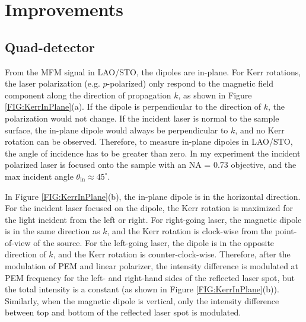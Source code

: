 \documentclass[pdflatex, sectionletters, 12pt]{pittetd}    %
\begin{document}
\section{Improvements}

\subsection{Quad-detector}

From the MFM signal in LAO/STO, the dipoles are in-plane. For Kerr rotations, the laser polarization (e.g. $p$-polarized) only respond to the magnetic field component along the direction of propagation $k$, as shown in Figure \ref{FIG:KerrInPlane}(a). If the dipole is perpendicular to the direction of $k$, the polarization would not change. If the incident laser is normal to the sample surface, the in-plane dipole would always be perpendicular to $k$, and no Kerr rotation can be observed. Therefore, to measure in-plane dipoles in LAO/STO, the angle of incidence has to be greater than zero. In my experiment the incident polarized laser is focused onto the sample with an NA = 0.73 objective, and the max incident angle $\theta_\mathrm{in} \approx 45^{\circ}$.  

In Figure \ref{FIG:KerrInPlane}(b), the in-plane dipole is in the horizontal direction. For the incident laser focused on the dipole, the Kerr rotation is maximized for the light incident from the left or right. For right-going laser, the magnetic dipole is in the same direction as $k$, and the Kerr rotation is clock-wise from the point-of-view of the source. For the left-going laser, the dipole is in the opposite direction of $k$, and the Kerr rotation is counter-clock-wise. Therefore, after the modulation of PEM and linear polarizer, the intensity difference is modulated at PEM frequency for the left- and right-hand sides of the reflected laser spot, but the total intensity is a constant (as shown in Figure \ref{FIG:KerrInPlane}(b)). Similarly, when the magnetic dipole is vertical, only the intensity difference between top and bottom of the reflected laser spot is modulated. 
\end{document}
